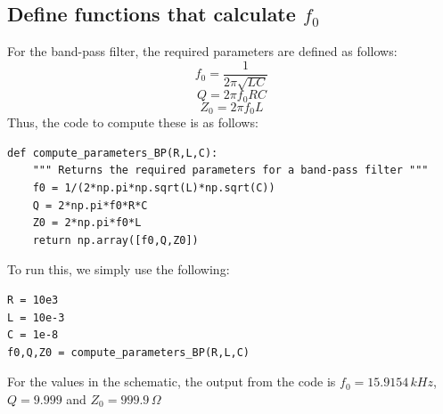 \documentclass[english]{article}
\begin{document}
\subsection{Define functions that calculate $f_0$}
For the band-pass filter, the required parameters are defined as follows:
$$ f_0 = \frac{1}{2\pi\sqrt{LC}} $$
$$ Q = 2\pi f_0 RC $$
$$ Z_0 = 2\pi f_0 L $$
Thus, the code to compute these is as follows:
\begin{lstlisting}
def compute_parameters_BP(R,L,C):
    """ Returns the required parameters for a band-pass filter """
    f0 = 1/(2*np.pi*np.sqrt(L)*np.sqrt(C))
    Q = 2*np.pi*f0*R*C
    Z0 = 2*np.pi*f0*L
    return np.array([f0,Q,Z0])
\end{lstlisting}
To run this, we simply use the following:
\begin{lstlisting}
R = 10e3
L = 10e-3
C = 1e-8
f0,Q,Z0 = compute_parameters_BP(R,L,C)
\end{lstlisting}
For the values in the schematic, the output from the code is $f_0 =15.9154\, kHz$, 
$Q =9.999$ and $Z_0 =999.9\, \Omega$
\end{document}
